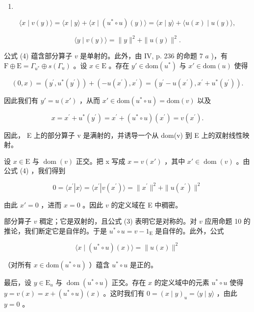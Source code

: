 \begin{enumerate}
\def\labelenumi{(\arabic{enumi})}
\setcounter{enumi}{2}
\tightlist
\item
\end{enumerate}

\[
\langle x \mid v (y) \rangle = \langle x \mid y \rangle + \langle x \mid (u ^ {*} \circ u) (y) \rangle = \langle x \mid y \rangle + \langle u (x) \mid u (y) \rangle ,\tag{4}
\]

\[
\langle y \mid v (y) \rangle = \| y \| ^ {2} + \| u (y) \| ^ {2}.
\]

公式 (4) 蕴含部分算子 \(v\) 是单射的。此外，由 IV, p. 236 的命题 7 \(a\) )，有 \(\mathrm{F} \oplus \mathrm{E} = \Gamma_{u^*} \oplus s(\Gamma_u)\) 。设 \(x \in \mathrm{E}\) 。存在 \(y' \in \mathrm{dom}(u^*)\) 与 \(x' \in \mathrm{dom}(u)\) 使得

\[
(0, x) = (y ^ {\prime}, u ^ {*} (y ^ {\prime})) + (- u (x ^ {\prime}), x ^ {\prime}) = (y ^ {\prime} - u (x ^ {\prime}), x ^ {\prime} + u ^ {*} (y ^ {\prime})).
\]

因此我们有 \(y' = u(x')\) ，从而 \(x' \in \text{dom}(u^* \circ u) = \text{dom}(v)\) 以及

\[
x = x ^ {\prime} + u ^ {*} (y ^ {\prime}) = x ^ {\prime} + (u ^ {*} \circ u) (x ^ {\prime}) = v (x ^ {\prime}).
\]

因此， E 上的部分算子 v 是满射的，并诱导一个从 dom(v) 到 E 上的双射线性映射。

设 \(x \in \mathrm{E}\) 与 \(\operatorname{dom}(v)\) 正交。把 x 写成 \(x = v(x')\) ，其中 \(x' \in \operatorname{dom}(v)\) 。由公式 (4) ，我们得到

\[
0 = \langle x ^ {\prime} | x \rangle = \langle x ^ {\prime} | v (x ^ {\prime}) \rangle = \| x ^ {\prime} \| ^ {2} + \| u (x ^ {\prime}) \| ^ {2}
\]

由此 \(x' = 0\) ，进而 \(x = 0\) 。因此 \(v\) 的定义域在 E 中稠密。

部分算子 \(v\) 稠定；它是双射的，且公式 (3) 表明它是对称的。对 \(v\) 应用命题 10 的推论，我们断定它是自伴的。于是 \(u^{*} \circ u = v - 1_{\mathrm{E}}\) 是自伴的。此外，公式

\[
\langle x \mid (u ^ {*} \circ u) (x) \rangle = \| u (x) \| ^ {2}
\]

（对所有 \(x \in \text{dom}(u^{*} \circ u)\) ）蕴含 \(u^{*} \circ u\) 是正的。

最后，设 \(y \in \mathrm{E}_u\) 与 \(\operatorname{dom}(u^* \circ u)\) 正交。存在 \(x\) 的定义域中的元素 \(u^* \circ u\) 使得 \(y = v(x) = x + (u^* \circ u)(x)\) 。这时我们有 \(0 = (x \mid y)_u = \langle y \mid y \rangle\) ，由此 \(y = 0\) 。

